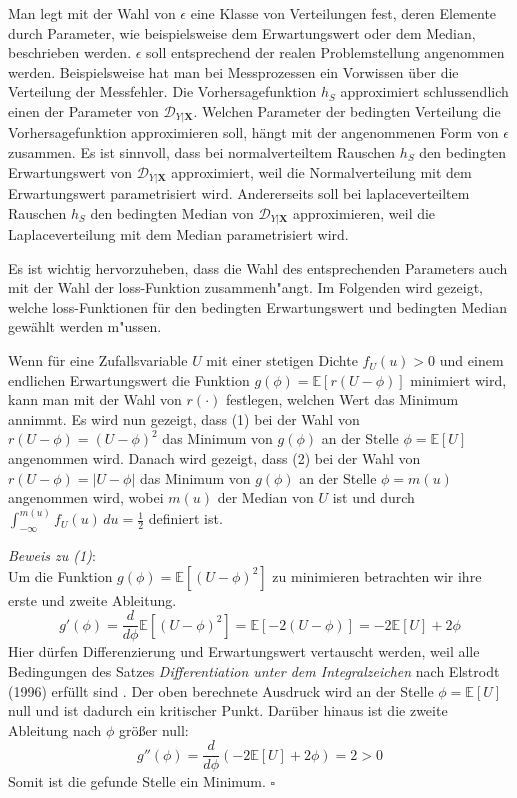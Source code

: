 Man legt mit der Wahl von $\epsilon$ eine Klasse von Verteilungen fest, deren Elemente durch Parameter, wie beispielsweise dem Erwartungswert oder dem Median,
beschrieben werden. $\epsilon$ soll entsprechend der realen Problemstellung angenommen werden.
Beispielsweise hat man bei Messprozessen ein Vorwissen \"uber die Verteilung der Messfehler.
Die Vorhersagefunktion $h_S$ approximiert schlussendlich einen
der Parameter von $\mathcal{D}_{Y|\mathbf{X}}$. Welchen Parameter der bedingten Verteilung die Vorhersagefunktion approximieren soll, h\"angt
mit der angenommenen Form von $\epsilon$ zusammen. Es ist sinnvoll, dass bei normalverteiltem Rauschen
$h_S$ den bedingten Erwartungswert von $\mathcal{D}_{Y|\mathbf{X}}$ approximiert, weil die Normalverteilung mit dem Erwartungswert parametrisiert wird.
Andererseits soll bei laplaceverteiltem Rauschen $h_S$ den bedingten Median von $\mathcal{D}_{Y|\mathbf{X}}$ approximieren, weil die
Laplaceverteilung mit dem Median parametrisiert wird.


Es ist wichtig hervorzuheben, dass die Wahl des entsprechenden Parameters auch mit der Wahl der loss-Funktion zusammenh"angt.
Im Folgenden wird gezeigt, welche loss-Funktionen f\"ur den bedingten Erwartungswert und bedingten Median gew\"ahlt werden m"ussen.


Wenn f\"ur eine Zufallsvariable $U$ mit einer stetigen Dichte $f_U(u) > 0$ und einem endlichen Erwartungswert die Funktion $g(\phi) = \mathbb{E}[r(U - \phi)]$ minimiert wird,
kann man mit der Wahl von $r(\cdot)$
festlegen, welchen Wert das Minimum annimmt. Es wird nun gezeigt, dass (1) bei der Wahl von $r(U - \phi) = (U - \phi)^2$ das Minimum von $g(\phi)$ an der Stelle
$\phi = \mathbb{E}[U]$ angenommen wird. Danach wird gezeigt, dass (2) bei der Wahl von $r(U - \phi) = |U - \phi|$ das Minimum von $g(\phi)$ an der Stelle
$\phi = m(u)$ angenommen wird, wobei $m(u)$ der Median von $U$ ist und durch $\int_{-\infty}^{m(u)} f_U(u) \, du = \frac{1}{2}$ definiert ist.

\textit{Beweis zu (1)}: \\
Um die Funktion $g(\phi) = \mathbb{E}[(U - \phi)^2]$ zu minimieren betrachten wir ihre erste und zweite Ableitung.
$$ g'(\phi) = \frac{d}{d\phi}\mathbb{E}[(U-\phi)^2] = \mathbb{E}[-2(U-\phi)] = -2\mathbb{E}[U] + 2\phi$$
Hier d\"urfen Differenzierung und Erwartungswert vertauscht werden, weil alle Bedingungen des Satzes \textit{Differentiation unter dem Integralzeichen}
nach Elstrodt (1996) erf\"ullt sind \cite[Kapitel 4, Satz 5.7]{elstrodt}.
Der oben berechnete Ausdruck wird an der Stelle $\phi = \mathbb{E}[U]$ null und ist dadurch ein kritischer Punkt. Dar\"uber hinaus ist die zweite
Ableitung nach $\phi$ gr\"o{\ss}er null:
$$g''(\phi) = \frac{d}{d\phi}(-2\mathbb{E}[U]+2\phi) = 2 > 0$$
Somit ist die gefunde Stelle ein Minimum. $\square$


